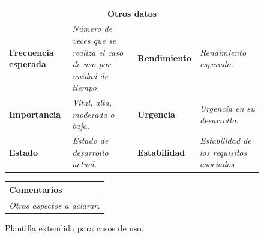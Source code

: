 \documentclass[12pt,spanish]{article}
\begin{document}
\begin{figure}[H]
\vspace{0.5cm}

\begin{tabular}{|m{3.75cm}|m{3.75cm}|m{3.75cm}|m{3.8cm}|}
\hline
\multicolumn{4}{|c|}{\textbf{Otros datos}} \\
\hline
\textbf{Frecuencia esperada} & \textit{Número de veces que se realiza el caso de uso por unidad de tiempo.} & \textbf{Rendimiento} & \textit{Rendimiento esperado.} \\
\hline
\textbf{Importancia} & \textit{Vital, alta, moderada o baja.} & \textbf{Urgencia} & \textit{Urgencia en su desarrollo.} \\
\hline
\textbf{Estado} & \textit{Estado de desarrollo actual.} & \textbf{Estabilidad} & \textit{Estabilidad de los requisitos asociados} \\
\hline
\end{tabular}

\vspace{1cm}

\begin{tabular}{|m{16.2cm}|}
\hline
\textbf{Comentarios} \\
\hline
\textit{Otros aspectos a aclarar.} \\
\hline
\end{tabular}

\caption{Plantilla extendida para casos de uso.}

\end{figure}
\end{document}
